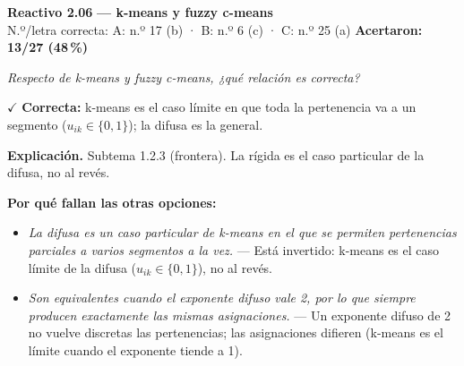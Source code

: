 \documentclass[10pt,letterpaper]{article}
\begin{document}
\begin{minipage}{\textwidth}
{\color{guinda}\textbf{Reactivo 2.06}} \textbf{— k-means y fuzzy c-means}\\[-1pt]
{\scriptsize N.º/letra correcta: A: n.º 17 (b) · B: n.º 6 (c) · C: n.º 25 (a) \hfill \textbf{Acertaron: 13/27 (48\,\%)}}

\textit{Respecto de k-means y \textit{fuzzy c-means}, ¿qué relación es correcta?}

\textcolor{verde}{$\checkmark$} \textbf{Correcta:} k-means es el caso límite en que toda la pertenencia va a un segmento ($u_{ik}\in\{0,1\}$); la difusa es la general.

\textbf{Explicación.} Subtema 1.2.3 (frontera). La rígida es el caso particular de la difusa, no al revés.

\textbf{Por qué fallan las otras opciones:}
\begin{itemize}[itemsep=0pt,topsep=1pt,leftmargin=1.3em,parsep=0pt]
\item[\textcolor{rojo}{$\times$}] \textit{La difusa es un caso particular de k-means en el que se permiten pertenencias parciales a varios segmentos a la vez.} --- Está invertido: k-means es el caso límite de la difusa ($u_{ik}\in\{0,1\}$), no al revés.
\item[\textcolor{rojo}{$\times$}] \textit{Son equivalentes cuando el exponente difuso vale 2, por lo que siempre producen exactamente las mismas asignaciones.} --- Un exponente difuso de 2 no vuelve discretas las pertenencias; las asignaciones difieren (k-means es el límite cuando el exponente tiende a 1).
\end{itemize}
\end{minipage}\par\vspace{5pt}{\color{gray!40}\hrule}\vspace{5pt}
\end{document}
